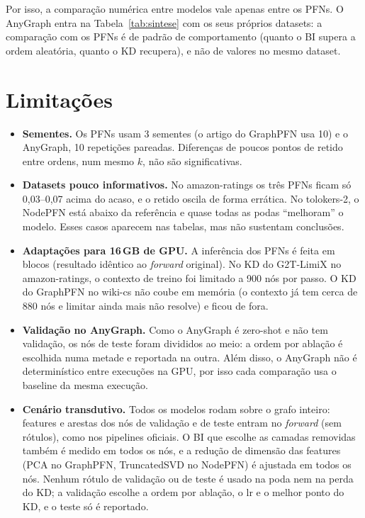 \documentclass[12pt,a4paper]{article}
\begin{document}
Por isso, a comparação numérica entre modelos vale apenas entre os PFNs. O AnyGraph entra na Tabela~\ref{tab:sintese} com os seus próprios datasets: a comparação com os PFNs é de padrão de comportamento (quanto o BI supera a ordem aleatória, quanto o KD recupera), e não de valores no mesmo dataset.

\section{Limitações}
\label{sec:limitacoes}

\begin{itemize}
  \item \textbf{Sementes.} Os PFNs usam 3 sementes (o artigo do GraphPFN usa 10) e o AnyGraph, 10 repetições pareadas. Diferenças de poucos pontos de retido entre ordens, num mesmo $k$, não são significativas.
  \item \textbf{Datasets pouco informativos.} No amazon-ratings os três PFNs ficam só 0,03--0,07 acima do acaso, e o retido oscila de forma errática. No tolokers-2, o NodePFN está abaixo da referência e quase todas as podas ``melhoram'' o modelo. Esses casos aparecem nas tabelas, mas não sustentam conclusões.
  \item \textbf{Adaptações para 16\,GB de GPU.} A inferência dos PFNs é feita em blocos (resultado idêntico ao \emph{forward} original). No KD do G2T-LimiX no amazon-ratings, o contexto de treino foi limitado a 900 nós por passo. O KD do GraphPFN no wiki-cs não coube em memória (o contexto já tem cerca de 880 nós e limitar ainda mais não resolve) e ficou de fora.
  \item \textbf{Validação no AnyGraph.} Como o AnyGraph é zero-shot e não tem validação, os nós de teste foram divididos ao meio: a ordem por ablação é escolhida numa metade e reportada na outra. Além disso, o AnyGraph não é determinístico entre execuções na GPU, por isso cada comparação usa o baseline da mesma execução.
  \item \textbf{Cenário transdutivo.} Todos os modelos rodam sobre o grafo inteiro: features e arestas dos nós de validação e de teste entram no \emph{forward} (sem rótulos), como nos pipelines oficiais. O BI que escolhe as camadas removidas também é medido em todos os nós, e a redução de dimensão das features (PCA no GraphPFN, TruncatedSVD no NodePFN) é ajustada em todos os nós. Nenhum rótulo de validação ou de teste é usado na poda nem na perda do KD; a validação escolhe a ordem por ablação, o lr e o melhor ponto do KD, e o teste só é reportado.

\end{itemize}
\end{document}
